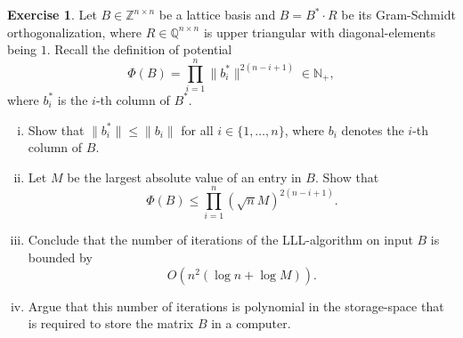 \documentclass[12pt,a4paper]{article}
\theoremstyle{plain}
\newtheorem*{Sol*}{Solution}
\theoremstyle{definition}
\newtheorem{Ex}{Exercise}
\newif\ifsolutions
\newcommand{\exercise}[2]{
			\begin{Ex} #1 \end{Ex}
			\ifsolutions  \begin{Sol*} #2 \end{Sol*} \bigskip \else \bigskip  \fi
		}
\begin{document}
\exercise{
  Let $B ∈ ℤ^{ n ×n}$ be a lattice basis and $Β= B^* ⋅ R$ be its Gram-Schmidt orthogonalization, where $R ∈ ℚ^{n ×n}$ is upper triangular with diagonal-elements being $1$. Recall the definition of potential
  \begin{displaymath}
    Φ(B) = ∏_{i=1}^n \|b_i^*\|^{2 (n-i+1)} ∈ℕ_+, 
  \end{displaymath}
  where $b_i^*$ is the $i$-th column of $B^*$. 

  \begin{enumerate}[i)]   
  \item Show that $\|b_i^* \| ≤ \|b_i\|$ for all $i ∈ \{1,\dots,n\}$, where $b_i$ denotes the $i$-th column of $B$. 
  \item Let $M$ be the largest absolute value of an entry in $B$. Show that
    \begin{displaymath}
       Φ(B) \leq ∏_{i=1}^n (\sqrt{n} M)^{2 (n-i+1)}. 
     \end{displaymath}
   \item Conclude that the number of iterations of the LLL-algorithm on input $B$ is bounded by
     \begin{displaymath}
       O(n^2 (\log n + \log M)).       
     \end{displaymath}
   \item Argue that this number of iterations is polynomial in the storage-space that is required to store the matrix $B$ in a computer. 
  \end{enumerate}
}{
	\begin{enumerate}[i)]
		\item Since $b_i^* = b_i + \sum_{j=1}^{i-1} \mu_{ji} b_j^*$ for some coefficients $\mu_{ji}$, Pythagoras' theorem gives
			\[ \| b_i^* \|_2^2 \leq \| b_i \|_2^2. \]

		\item Clearly, one has for each $i$,
			\[ \| b_i \|_2^2 \leq n M^2, \]
		which concludes given the definition of $\Phi(B)$ and question i). 

		\item Simplifying the upperbound, we have
			\[ \Phi(B) \leq (\sqrt{n}M)^{n(n-1)}. \]
		Since each step of LLL decreases the potential by a multiplicative factor, and since the potential is always integer, the number of steps is of order $\log \Phi(B) = \mathcal{O}\left(n^2 \left( \log n + \log M \right) \right)$.

		\item Each $n^2$ entry of $B$ is an integer bounded by $M$. 
		Hence, their bit representation has size bounded by $\log M$.
		Storing $B$ therefore takes space of order $n^2 \log M$.
	\end{enumerate}

}
\end{document}
